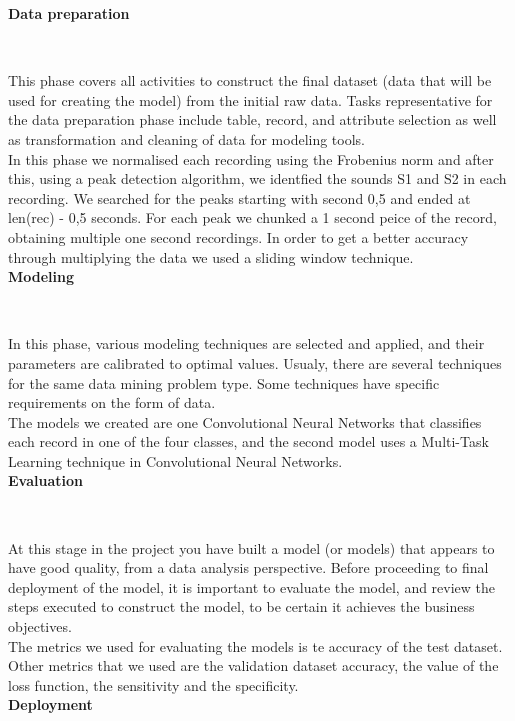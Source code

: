 \documentclass[11pt, a4papper]{report}
\theoremstyle{plain}
\theoremstyle{definition}
\theoremstyle{definition}
\theoremstyle{proposition}
\begin{document}
\textbf{Data preparation}

\

This phase covers all activities to construct the final dataset (data that will be used for creating the model) from the initial raw data. Tasks representative for the data preparation phase include table, record, and attribute selection as well as transformation and cleaning of data for modeling tools.
\\

In this phase we normalised each recording using the Frobenius norm and after this, using a peak detection algorithm, we identfied the sounds S1 and S2 in each recording. We searched for the peaks starting with second 0,5 and ended at len(rec) - 0,5 seconds. For each peak we chunked a 1 second peice of the record, obtaining multiple one second recordings. In order to get a better accuracy through multiplying the data we used a sliding window technique.
\\

\textbf{Modeling}

\

In this phase, various modeling techniques are selected and applied, and their parameters are calibrated to optimal values. Usualy, there are several techniques for the same data mining problem type. Some techniques have specific requirements on the form of data.
\\

The models we created are one Convolutional Neural Networks that classifies each record in one of the four classes, and the second model uses a Multi-Task Learning technique in Convolutional Neural Networks.
\\

\textbf{Evaluation}

\

At this stage in the project you have built a model (or models) that appears to have good quality, from a data analysis perspective. Before proceeding to final deployment of the model, it is important to evaluate the model, and review the steps executed to construct the model, to be certain it achieves the business objectives.
\\

The metrics we used for evaluating the models is te accuracy of the test dataset. Other metrics that we used are the validation dataset accuracy, the value of the loss function, the sensitivity and the specificity.
\\

\textbf{Deployment}
\end{document}
